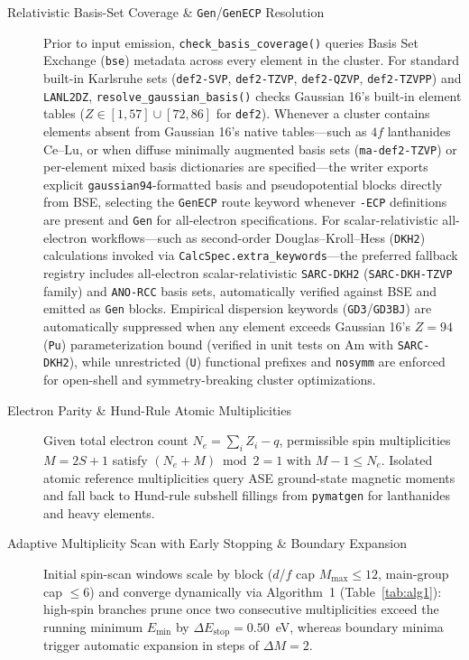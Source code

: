 \documentclass[journal=jctcce,manuscript=article]{achemso}
\begin{document}
\begin{description}
  \item[Relativistic Basis-Set Coverage \& \texttt{Gen}/\texttt{GenECP} Resolution] Prior to input emission, \texttt{check\_basis\_coverage()} queries Basis Set Exchange (\texttt{bse})\cite{pritchard2019bse} metadata across every element in the cluster. For standard built-in Karlsruhe sets (\texttt{def2-SVP}, \texttt{def2-TZVP}, \texttt{def2-QZVP}, \texttt{def2-TZVPP})\cite{weigend2005def2} and \texttt{LANL2DZ}, \texttt{resolve\_gaussian\_basis()} checks Gaussian 16's built-in element tables ($Z \in [1,57] \cup [72,86]$ for \texttt{def2}). Whenever a cluster contains elements absent from Gaussian 16's native tables---such as $4f$ lanthanides $\mathrm{Ce\text{--}Lu}$, or when diffuse minimally augmented basis sets (\texttt{ma-def2-TZVP})\cite{zheng2011madef2} or per-element mixed basis dictionaries are specified---the writer exports explicit \texttt{gaussian94}-formatted basis and pseudopotential blocks directly from BSE, selecting the \texttt{GenECP} route keyword whenever \texttt{-ECP} definitions are present and \texttt{Gen} for all-electron specifications. For scalar-relativistic all-electron workflows---such as second-order Douglas--Kroll--Hess (\texttt{DKH2})\cite{reiher2006dkh} calculations invoked via \texttt{CalcSpec.extra\_keywords}---the preferred fallback registry includes all-electron scalar-relativistic \texttt{SARC-DKH2} (\texttt{SARC-DKH-TZVP} family)\cite{pantazis2009sarc} and \texttt{ANO-RCC} basis sets, automatically verified against BSE and emitted as \texttt{Gen} blocks. Empirical dispersion keywords (\texttt{GD3}/\texttt{GD3BJ})\cite{grimme2011d3bj} are automatically suppressed when any element exceeds Gaussian 16's $Z = 94$ (\texttt{Pu}) parameterization bound (verified in unit tests on $\mathrm{Am}$ with \texttt{SARC-DKH2}), while unrestricted (\texttt{U}) functional prefixes and \texttt{nosymm} are enforced for open-shell and symmetry-breaking cluster optimizations.
  \item[Electron Parity \& Hund-Rule Atomic Multiplicities] Given total electron count $N_e = \sum_i Z_i - q$, permissible spin multiplicities $M = 2S + 1$ satisfy $(N_e + M) \bmod 2 = 1$ with $M - 1 \le N_e$. Isolated atomic reference multiplicities query ASE ground-state magnetic moments and fall back to Hund-rule subshell fillings from \texttt{pymatgen} for lanthanides and heavy elements.
  \item[Adaptive Multiplicity Scan with Early Stopping \& Boundary Expansion] Initial spin-scan windows scale by block ($d$/$f$ cap $M_{\max} \le 12$, main-group cap $\le 6$) and converge dynamically via Algorithm~1 (Table~\ref{tab:alg1}): high-spin branches prune once two consecutive multiplicities exceed the running minimum $E_{\min}$ by $\Delta E_{\text{stop}} = 0.50$~eV, whereas boundary minima trigger automatic expansion in steps of $\Delta M = 2$.

\end{description}
\end{document}
